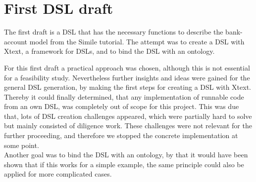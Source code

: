 \section{First DSL draft}
\par
The first draft is a DSL that has the necessary functions to describe the bank-account model from the Simile \autocite{dsl:similie_tutorial_bank} tutorial. The attempt was to create a DSL with Xtext, a framework for DSLs, and to bind the DSL with an ontology.  
\par
For this first draft a practical approach was chosen, although this is not essential for a feasibility study. Nevertheless further insights and ideas were gained for the general DSL generation, by making the first steps for creating a DSL with Xtext. Thereby it could finally determined, that any implementation of runnable code from an own DSL, was completely out of scope for this project. This was due that, lots of DSL creation challenges appeared, which were partially hard to solve but mainly consisted of diligence work. These challenges were not relevant for the further proceeding, and therefore we stopped the concrete implementation at some point.\\
Another goal was to bind the DSL with an ontology, by that it would have been shown that if this works for a simple example, the same principle could also be applied for more complicated cases. 

